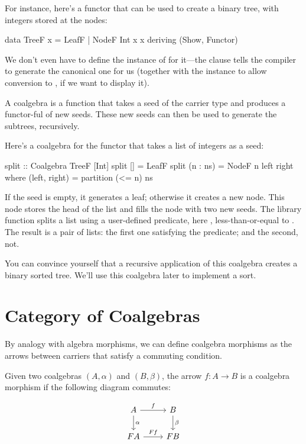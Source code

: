 \documentclass[DaoFP]{subfiles}
\begin{document}
For instance, here's a functor that can be used to create a binary tree, with integers stored at the nodes:
\begin{haskell}
data TreeF x = LeafF | NodeF Int x x
  deriving (Show, Functor)
\end{haskell}
We don't even have to define the instance of  for it---the  clause tells the compiler to generate the canonical one for us (together with the  instance to allow conversion to , if we want to display it).

A coalgebra is a function that takes a seed of the carrier type and produces a functor-ful of new seeds. These new seeds can then be used to generate the subtrees, recursively. 

Here's a coalgebra for the functor  that takes a list of integers as a seed:
\begin{haskell}
split :: Coalgebra TreeF [Int]
split [] = LeafF
split (n : ns) = NodeF n left right
  where
    (left, right) = partition (<= n) ns
\end{haskell}
If the seed is empty, it generates a leaf; otherwise it creates a new node. This node stores the head of the list and fills the node with two new seeds. The library function  splits a list using a user-defined predicate, here , less-than-or-equal to . The result is a pair of lists: the first one satisfying the predicate; and the second, not. 

You can convince yourself that a recursive application of this coalgebra creates a binary sorted tree. We'll use this coalgebra later to implement a sort.

\section{Category of Coalgebras}

By analogy with algebra morphisms, we can define coalgebra morphisms as the arrows between carriers that satisfy a commuting condition. 

Given two coalgebras $(A, \alpha)$ and $(B, \beta)$, the arrow $f \colon A \to B$ is a coalgebra morphism if the following diagram commutes:

\[
 \begin{tikzcd}
 A 
 \arrow[r, "f"]
 \arrow[d, "\alpha"]
 & B
\arrow[d, "\beta"]
 \\
F  A
 \arrow[r, "F f"]
 & F B
  \end{tikzcd}
\]
\end{document}
